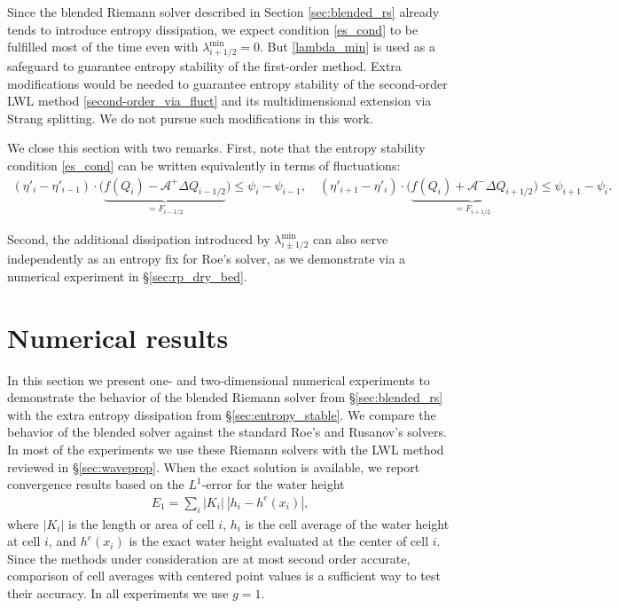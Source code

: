 \documentclass[preprint, 11pt]{article}
\newcommand{\A}{{\mathcal A}}
\newcommand{\bff}{{f}}
\newcommand{\bfF}{{F}}
\newcommand{\entvar}{\eta'}
\newcommand{\bfq}{{Q}}
\newcommand{\bfx}{{x}}
\newcommand{\efp}{\psi}
\begin{document}
Since the blended Riemann solver described in Section \ref{sec:blended_rs} already
tends to introduce entropy dissipation,
we expect condition \eqref{es_cond} to be fulfilled most of the time even with $\lambda_{i+1/2}^{\min}=0$.
But \eqref{lambda_min} is used as a safeguard to guarantee entropy stability of the first-order method.
Extra modifications would be needed to guarantee entropy stability of the second-order LWL method
\eqref{second-order_via_fluct} and its multidimensional extension via Strang splitting.
We do not pursue such modifications in this work.

We close this section with two remarks.  First, note that 
the entropy stability condition \eqref{es_cond} can be written equivalently in terms of fluctuations:
\begin{align*}
  (\entvar_{i}-\entvar_{i-1})\cdot
  \Big(
  \underbrace{\bff(\bfq_i)-\A^+\Delta Q_{i-1/2}}_{=\bfF_{i-1/2}}\Big)\leq \efp_{i}-\efp_{i-1},
  \quad
  (\entvar_{i+1}-\entvar_i)\cdot
  \Big(\underbrace{\bff(\bfq_i)+\A^-\Delta Q_{i+1/2}}_{=\bfF_{i+1/2}}\Big)\leq \efp_{i+1}-\efp_i.
\end{align*}

Second, the additional dissipation introduced by $\lambda_{i\pm 1/2}^{\min}$ can also
serve independently as an entropy fix for Roe's solver, as we demonstrate
via a numerical experiment in \S \ref{sec:rp_dry_bed}.

\section{Numerical results}\label{sec:num}
In this section we present one- and two-dimensional numerical experiments to demonstrate the behavior of the
blended Riemann solver from \S\ref{sec:blended_rs} with the extra entropy dissipation from \S\ref{sec:entropy_stable}.
We compare the behavior of the blended solver against the standard Roe's and Rusanov's solvers.
In most of the experiments we use these Riemann solvers with the LWL method reviewed in \S\ref{sec:waveprop}.
When the exact solution is available, we report convergence results based on the $L^1$-error for the water height
\begin{align*}
  E_1=\sum_i|K_i|~|h_i-h^e(\bfx_i)|,
\end{align*}
where $|K_i|$ is the length or area of cell $i$,
$h_i$ is the cell average of the water height at cell $i$,
and $h^e(\bfx_i)$ is the exact water height evaluated at the center of cell $i$.
Since the methods under consideration are at most second order accurate, comparison
of cell averages with centered point values is a sufficient way to test their accuracy.
In all experiments we use $g=1$.
\end{document}

